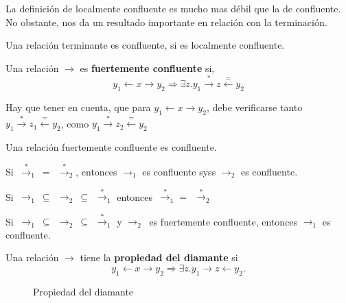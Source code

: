 La definición de localmente confluente es mucho mas débil que la de
confluente. No obstante, nos da un resultado importante en relación con la
terminación.

\begin{lema} 
  Una relación terminante es confluente, si es localmente confluente.
\end{lema}

\begin{defi}
  Una relación $\rightarrow$ es \textbf{fuertemente confluente} si,
  \[
    y_1 \leftarrow x \rightarrow y_2 \Rightarrow 
    \exists z.  y_1 \xrightarrow{*} z \xleftarrow{=} y_2
  \] 
\end{defi}

Hay que tener en cuenta, que para $y_1 \leftarrow x \rightarrow y_2$, debe
verificarse tanto $y_1 \xrightarrow{*} z_1 \xleftarrow{=} y_2$, como
$y_1 \xrightarrow{*} z_2 \xleftarrow{=} y_2$

\begin{lema} 
  Una relación fuertemente confluente es confluente.
\end{lema}

\begin{lema} 
  Si $ \ \xrightarrow{*}_1 \ = \ \ \xrightarrow{*}_2$, entonces $\rightarrow_1$
  es confluente syss $\rightarrow_2$ es confluente.
\end{lema}

\begin{lema}
  Si
  $ \ \rightarrow_1 \ \subseteq \ \ \rightarrow_2 \ \subseteq \ \
  \xrightarrow{*}_1 $ entonces $ \ \xrightarrow{*}_1 = \ \ \xrightarrow{*}_2$
\end{lema}

\begin{coro}
  Si
  $ \ \rightarrow_1 \ \subseteq \ \ \rightarrow_2 \ \subseteq \ \
  \xrightarrow{*}_1 $ y $\rightarrow_2 \ $ es fuertemente confluente, entonces
  $\rightarrow_1$ es confluente.
\end{coro}


\begin{defi}
  Una relación $\rightarrow$ tiene la \textbf{propiedad del diamante} si
  \[
    y_1 \leftarrow x \rightarrow y_2 \Rightarrow \exists z. y_1 \rightarrow z \leftarrow y_2. 
  \]
\end{defi} 

\begin{figure}[h]
  \centering
        
\caption{Propiedad del diamante}
\end{figure}    


